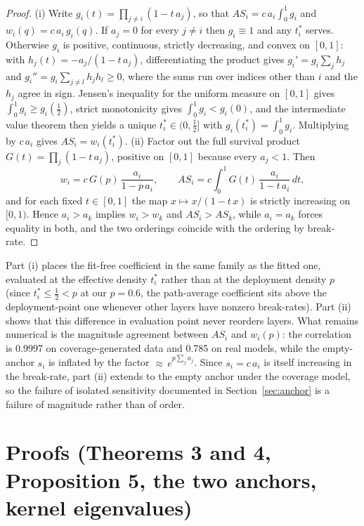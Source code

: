 \begin{proof}
(i) Write $g_i(t) = \prod_{j\ne i}(1 - t\,a_j)$, so that $AS_i = c\,a_i\int_0^1 g_i$ and
$w_i(q) = c\,a_i\,g_i(q)$. If $a_j = 0$ for every $j \ne i$ then $g_i \equiv 1$ and any $t_i^{*}$
serves. Otherwise $g_i$ is positive, continuous, strictly decreasing, and convex on $[0,1]$: with
$h_j(t) = -a_j/(1 - t\,a_j)$, differentiating the product gives $g_i' = g_i\sum_{j} h_j$ and
$g_i'' = g_i\sum_{j \ne l} h_j h_l \ge 0$, where the sums run over indices other than $i$ and the
$h_j$ agree in sign. Jensen's inequality for the uniform measure on $[0,1]$ gives
$\int_0^1 g_i \ge g_i(\tfrac12)$, strict monotonicity gives $\int_0^1 g_i < g_i(0)$, and the
intermediate value theorem then yields a unique $t_i^{*} \in (0, \tfrac12]$ with
$g_i(t_i^{*}) = \int_0^1 g_i$. Multiplying by $c\,a_i$ gives $AS_i = w_i(t_i^{*})$.
(ii) Factor out the full survival product $G(t) = \prod_{j}(1 - t\,a_j)$, positive on $[0,1]$ because
every $a_j < 1$. Then
\[
  w_i = c\,G(p)\,\frac{a_i}{1 - p\,a_i},
  \qquad
  AS_i = c\int_0^1 G(t)\,\frac{a_i}{1 - t\,a_i}\,dt ,
\]
and for each fixed $t \in [0,1]$ the map $x \mapsto x/(1 - t\,x)$ is strictly increasing on $[0,1)$.
Hence $a_i > a_k$ implies $w_i > w_k$ and $AS_i > AS_k$, while $a_i = a_k$ forces equality in both, and
the two orderings coincide with the ordering by break-rate.
\end{proof}

Part (i) places the fit-free
coefficient in the same family as the fitted one, evaluated at the effective density $t_i^{*}$ rather
than at the deployment density $p$ (since $t_i^{*} \le \tfrac12 < p$ at our $p=0.6$, the path-average
coefficient sits above the deployment-point one whenever other layers have nonzero break-rates). Part
(ii) shows that this difference in evaluation point never reorders layers. What remains numerical is
the magnitude agreement between $AS_i$ and
$w_i(p)$: the correlation is 0.9997 on coverage-generated data and 0.785 on real models, while the
empty-anchor $s_i$ is inflated by the factor ${\approx}\,e^{p\sum_j a_j}$. Since $s_i = c\,a_i$
is itself increasing in the break-rate, part (ii) extends to the empty anchor under the coverage model,
so the failure of isolated sensitivity documented in Section~\ref{sec:anchor} is a failure of magnitude rather
than of order. 

\section{Proofs (Theorems 3 and 4, Proposition 5, the two anchors, kernel eigenvalues)}\label{app:proofs}


